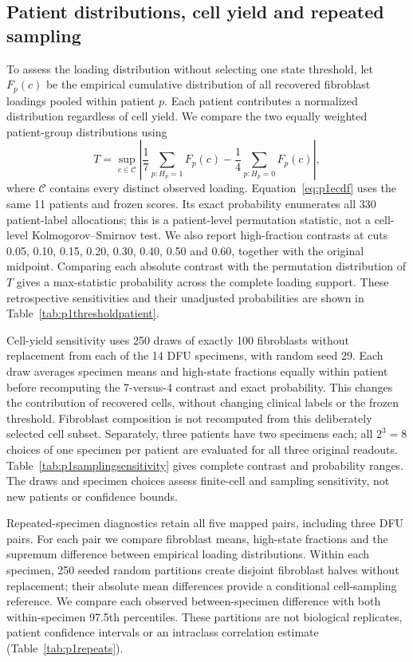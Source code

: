 \documentclass[10pt,a4paper]{article}
\begin{document}
\subsection{Patient distributions, cell yield and repeated sampling}
To assess the loading distribution without selecting one state threshold, let $F_p(c)$ be the empirical cumulative distribution of all recovered fibroblast loadings pooled within patient $p$. Each patient contributes a normalized distribution regardless of cell yield. We compare the two equally weighted patient-group distributions using
\begin{equation}
T=\sup_{c\in\mathcal C}\left|\frac1{7}\sum_{p:H_p=1}F_p(c)-\frac1{4}\sum_{p:H_p=0}F_p(c)\right|,\label{eq:p1ecdf}
\end{equation}
where $\mathcal C$ contains every distinct observed loading. Equation~\eqref{eq:p1ecdf} uses the same 11 patients and frozen scores. Its exact probability enumerates all 330 patient-label allocations; this is a patient-level permutation statistic, not a cell-level Kolmogorov--Smirnov test. We also report high-fraction contrasts at cuts 0.05, 0.10, 0.15, 0.20, 0.30, 0.40, 0.50 and 0.60, together with the original midpoint. Comparing each absolute contrast with the permutation distribution of $T$ gives a max-statistic probability across the complete loading support. These retrospective sensitivities and their unadjusted probabilities are shown in Table~\ref{tab:p1thresholdpatient}.

Cell-yield sensitivity uses 250 draws of exactly 100 fibroblasts without replacement from each of the 14 DFU specimens, with random seed 29. Each draw averages specimen means and high-state fractions equally within patient before recomputing the 7-versus-4 contrast and exact probability. This changes the contribution of recovered cells, without changing clinical labels or the frozen threshold. Fibroblast composition is not recomputed from this deliberately selected cell subset. Separately, three patients have two specimens each; all $2^3=8$ choices of one specimen per patient are evaluated for all three original readouts. Table~\ref{tab:p1samplingsensitivity} gives complete contrast and probability ranges. The draws and specimen choices assess finite-cell and sampling sensitivity, not new patients or confidence bounds.


Repeated-specimen diagnostics retain all five mapped pairs, including three DFU pairs. For each pair we compare fibroblast means, high-state fractions and the supremum difference between empirical loading distributions. Within each specimen, 250 seeded random partitions create disjoint fibroblast halves without replacement; their absolute mean differences provide a conditional cell-sampling reference. We compare each observed between-specimen difference with both within-specimen 97.5th percentiles. These partitions are not biological replicates, patient confidence intervals or an intraclass correlation estimate (Table~\ref{tab:p1repeats}).
\end{document}
